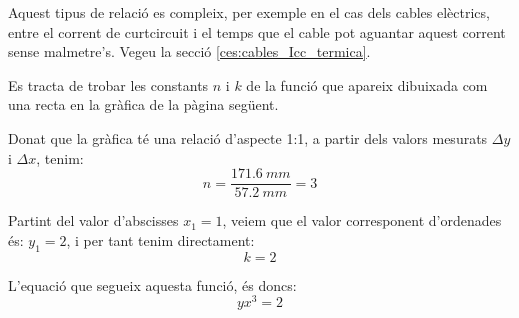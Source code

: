 Aquest tipus de relació es compleix, per exemple en el cas dels cables elèctrics, entre el corrent de curtcircuit i el temps que el cable pot aguantar aquest corrent sense malmetre's. Vegeu la secció \vref{ces:cables_Icc_termica}.


\begin{exemple}
    Es tracta de trobar les constants $n$ i $k$ de la funció que apareix dibuixada com una recta en la gràfica de la pàgina següent.

     Donat que la gràfica té una relació d'aspecte 1:1, a partir dels valors mesurats $\Delta{}y$ i $\Delta{}x$, tenim:
    \[
        n = \frac{\SI{171,6}{mm}}{\SI{57,2}{mm}} = 3
    \]

    Partint del valor d'abscisses $x_1=1$, veiem que el valor corresponent d'ordenades és: $y_1=2$, i per tant tenim directament:
    \[
        k = 2
    \]

    L'equació que segueix aquesta funció, és doncs:
    \[
        y x^3 = 2
    \]

   \begin{center}
        
   \end{center}

\end{exemple}

